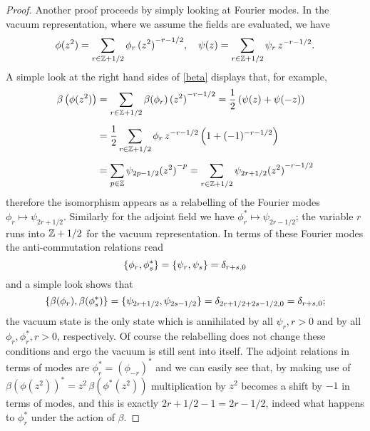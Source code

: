 \begin{proof}
\bigskip 
Another proof proceeds by simply looking at Fourier modes. 
In the vacuum representation, where we assume the fields are 
evaluated, we have 
\[
 \phi(z^2)=\sum_{r\in\Z+1/2}\phi_r\,
 {(z^2)}^{-r-1/2},\quad
 \psi(z)=\sum_{r\in\Z+1/2}\psi_r\,
 z^{-r-1/2}.
\]
A simple look at the right hand sides of \eqref{beta} 
displays that, for example,
\begin{align*}
\beta\left(\phi(z^2)\right)&=\sum_{r\in\Z+1/2}\beta(\phi_r)\,
 {(z^2)}^{-r-1/2}=
\frac{1}{2}\left(\psi(z)+\psi(-z)\right)\\[1ex]
&=\frac{1}{2}\sum_{r\in\Z+1/2}\phi_r\,z^{-r-1/2}
\left(1+(-1)^{-r-1/2}\right) \\[1ex]
&=\sum_{p\in\Z}\psi_{2p-1/2}{(z^2)}^{-p}=
\sum_{r\in\Z+1/2}\psi_{2r+1/2}{(z^2)}^{-r-1/2}
\end{align*}
therefore the isomorphism appears as a relabelling 
of the Fourier modes $\phi_r\mapsto\psi_{2r+1/2}$.
Similarly for the adjoint field we have 
$\phi^*_r\mapsto\psi_{2r-1/2}$; the variable $r$
runs into $\Z+1/2$ for the vacuum representation.
In terms of these Fourier modes the anti-commutation
relations read
\[
\ant{\phi_r,\phi^*_s}=\ant{\psi_r,\psi_s}=\delta_{r+s,0}
\]
and a simple look shows that
\[
\ant*{\beta(\phi_r),\beta(\phi^*_s)}=
\ant{\psi_{2r+1/2},\psi_{2s-1/2}}=\delta_{2r+1/2+2s-1/2,0}
=\delta_{r+s,0};
\]
the vacuum state is the only state which is annihilated 
by all $\psi_r, r>0$ and by all $\phi_r,\phi_r^*, r>0$,
respectively. Of course the relabelling does not 
change these conditions and ergo the vacuum is still sent 
into itself. The adjoint relations in terms of modes are
$\phi_r^*=(\phi_{-r})^*$ and we can easily see that, by 
making use of $\beta(\phi(z^2))^*=z^2\,\beta(\phi^*(z^2))$
multiplication by $z^2$ becomes a shift by $-1$ in terms 
of modes, and this is exactly $2r+1/2-1=2r-1/2$, indeed 
what happens to $\phi^*_r$ under the action of $\beta$.


\end{proof}
